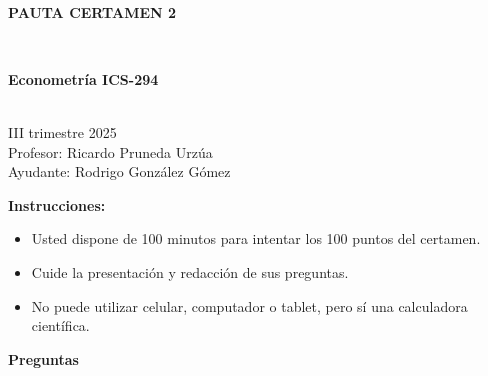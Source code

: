 \documentclass[10pt,a4paper]{article}
\begin{document}
\vspace{5cm}



\begin{center}
\begin{large}
\textbf{\\PAUTA CERTAMEN 2}
\end{large}\\
\end{center}

\begin{center}
\begin{large}
\textbf{Econometría ICS-294}
\end{large}\\
\vspace{0.2cm}
III trimestre 2025\\
Profesor: Ricardo Pruneda Urzúa\\
Ayudante: Rodrigo González Gómez
\end{center}

\textbf{Instrucciones:} 

\begin{itemize}

    \item Usted dispone de 100 minutos  para intentar los 100 puntos del certamen.
    \item Cuide la presentación y redacción de sus preguntas.
    \item No puede utilizar celular, computador o tablet, pero sí una calculadora científica.
     
\end{itemize}

\textbf{Preguntas}
\end{document}

